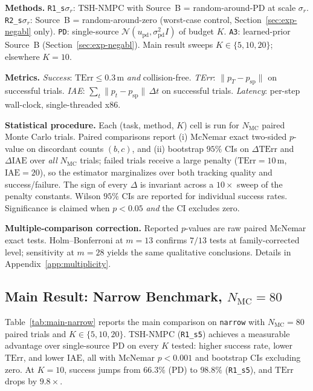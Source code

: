 \documentclass[11pt,onecolumn,a4paper]{article}
\newcommand{\Nm}{N_{\mathrm{MC}}}
\newcommand{\spt}{\mathrm{sp}}
\newcommand{\pd}{\mathrm{pd}}
\newcommand{\dt}{\Delta t}
\newcommand{\TErr}{\mathrm{TErr}}
\newcommand{\IAE}{\mathrm{IAE}}
\begin{document}
\textbf{Methods.} \texttt{R1\_s$\sigma_r$}: TSH-NMPC with Source~B =
random-around-PD at scale $\sigma_r$. \texttt{R2\_s$\sigma_r$}: Source~B
= random-around-zero (worst-case control,
Section~\ref{sec:exp-negabl} only). \texttt{PD}: single-source
$\mathcal{N}(u_\pd, \sigma_\pd^2 I)$ of budget $K$. \texttt{A3}:
learned-prior Source~B (Section~\ref{sec:exp-negabl}). Main result
sweeps $K \in \{5, 10, 20\}$; elsewhere $K = 10$.

\textbf{Metrics.} \emph{Success}: $\TErr \le 0.3\,$m \emph{and}
collision-free. \emph{TErr}: $\|p_T - p_\spt\|$ on successful trials.
\emph{IAE}: $\sum_t \|p_t - p_\spt\|\,\dt$ on successful trials.
\emph{Latency}: per-step wall-clock, single-threaded x86.

\textbf{Statistical procedure.} Each (task, method, $K$) cell is run
for $\Nm$ paired Monte Carlo trials. Paired comparisons report (i)
McNemar exact two-sided $p$-value on discordant counts $(b, c)$, and
(ii) bootstrap $95\%$ CIs on $\Delta\TErr$ and $\Delta\IAE$ over
\emph{all} $\Nm$ trials; failed trials receive a large penalty
($\TErr = 10\,\mathrm{m}$, $\IAE = 20$), so the estimator marginalizes
over both tracking quality and success/failure. The sign of every
$\Delta$ is invariant across a $10\times$ sweep of the penalty constants.
Wilson $95\%$ CIs are reported for individual success rates.
Significance is claimed when $p < 0.05$ \emph{and} the CI excludes zero.

\textbf{Multiple-comparison correction.}
Reported $p$-values are raw paired McNemar exact tests. Holm--Bonferroni
\cite{HOL79} at $m = 13$ confirms $7/13$ tests at family-corrected
level; sensitivity at $m = 28$ yields the same qualitative conclusions.
Details in Appendix~\ref{app:multiplicity}.

\subsection{Main Result: Narrow Benchmark, $\Nm = 80$}\label{sec:exp-main}

Table~\ref{tab:main-narrow} reports the main comparison on
\texttt{narrow} with $\Nm = 80$ paired trials and
$K \in \{5, 10, 20\}$. TSH-NMPC (\texttt{R1\_s5}) achieves a
measurable advantage over single-source PD on every $K$ tested:
higher success rate, lower
$\TErr$, and lower $\IAE$, all with McNemar $p < 0.001$ and bootstrap
CIs excluding zero. At $K = 10$, success jumps from $66.3\%$ (PD) to
$98.8\%$ (\texttt{R1\_s5}), and $\TErr$ drops by $9.8\times$.
\end{document}
